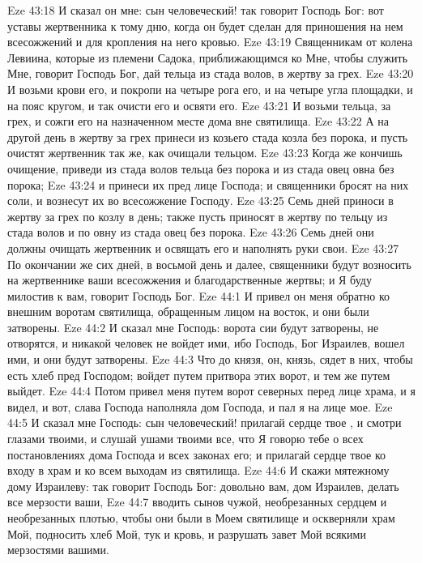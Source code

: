 \vs Eze 43:18 И сказал он мне: сын человеческий! так говорит Господь Бог: вот уставы жертвенника к тому дню, когда он будет сделан для приношения на нем всесожжений и для кропления на него кровью.
\vs Eze 43:19 Священникам от колена Левиина, которые из племени Садока, приближающимся ко Мне, чтобы служить Мне, говорит Господь Бог, дай тельца из стада волов, в жертву за грех.
\vs Eze 43:20 И возьми крови его, и покропи на четыре рога его, и на четыре угла площадки, и на пояс кругом, и так очисти его и освяти его.
\vs Eze 43:21 И возьми тельца,  за грех, и сожги его на назначенном месте дома вне святилища.
\vs Eze 43:22 А на другой день в жертву за грех принеси из козьего стада козла без порока, и пусть очистят жертвенник так же, как очищали тельцом.
\vs Eze 43:23 Когда же кончишь очищение, приведи из стада волов тельца без порока и из стада овец овна без порока;
\vs Eze 43:24 и принеси их пред лице Господа; и священники бросят на них соли, и вознесут их во всесожжение Господу.
\vs Eze 43:25 Семь дней приноси в жертву за грех по козлу в день; также пусть приносят в жертву по тельцу из стада волов и по овну из стада овец без порока.
\vs Eze 43:26 Семь дней они должны очищать жертвенник и освящать его и наполнять руки свои.
\vs Eze 43:27 По окончании же сих дней, в восьмой день и далее, священники будут возносить на жертвеннике ваши всесожжения и благодарственные жертвы; и Я буду милостив к вам, говорит Господь Бог.
\vs Eze 44:1 И привел он меня обратно ко внешним воротам святилища, обращенным лицом на восток, и они были затворены.
\vs Eze 44:2 И сказал мне Господь: ворота сии будут затворены, не отворятся, и никакой человек не войдет ими, ибо Господь, Бог Израилев, вошел ими, и они будут затворены.
\vs Eze 44:3 Что до князя, он,  князь, сядет в них, чтобы есть хлеб пред Господом; войдет путем притвора этих ворот, и тем же путем выйдет.
\vs Eze 44:4 Потом привел меня путем ворот северных перед лице храма, и я видел, и вот, слава Господа наполняла дом Господа, и пал я на лице мое.
\vs Eze 44:5 И сказал мне Господь: сын человеческий! прилагай сердце твое , и смотри глазами твоими, и слушай ушами твоими все, что Я говорю тебе о всех постановлениях дома Господа и всех законах его; и прилагай сердце твое ко входу в храм и ко всем выходам из святилища.
\vs Eze 44:6 И скажи мятежному дому Израилеву: так говорит Господь Бог: довольно вам, дом Израилев, делать все мерзости ваши,
\vs Eze 44:7 вводить сынов чужой, необрезанных сердцем и необрезанных плотью, чтобы они были в Моем святилище и оскверняли храм Мой, подносить хлеб Мой, тук и кровь, и разрушать завет Мой всякими мерзостями вашими.

